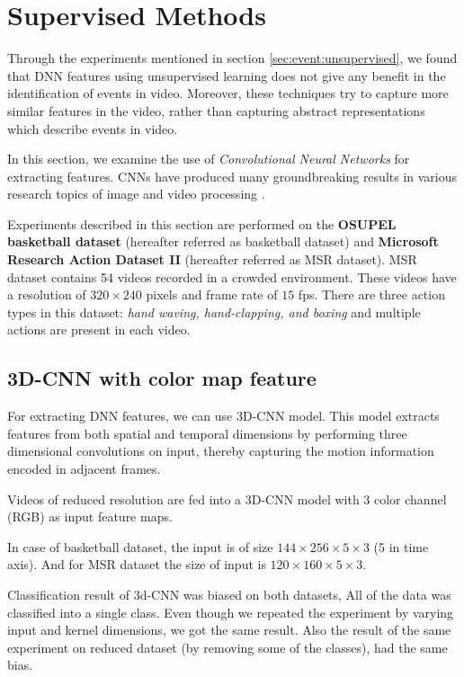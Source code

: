 \section{Supervised Methods}
\label{sec:event:supervised}
Through the experiments mentioned in section  \ref{sec:event:unsupervised}, we found that DNN features using unsupervised learning does not give any benefit in the identification of events in video.  Moreover, these techniques try to capture more similar features in the video, rather than capturing abstract representations which describe events in video.

In this section, we examine the use of \textit{Convolutional Neural Networks} for extracting features.  CNNs have produced many groundbreaking results in various research topics of image and video processing \citep{KarpathyCVPR14, ji20133d, krizhevsky2012imagenet}.

Experiments described in this section are performed on the \textbf{OSUPEL basketball dataset} \cite{brendel2011probabilistic} (hereafter referred as basketball dataset) and \textbf{Microsoft Research Action Dataset \RN{2}} (hereafter referred as MSR dataset).  MSR dataset contains 54 videos recorded in a crowded environment.  These videos have a resolution of $320 \times 240$ pixels and frame rate of $15$ fps.  There are three action types in this dataset: \textit{hand waving, hand-clapping, and boxing } and multiple actions are present in each video.

\subsection{3D-CNN with color map feature}
For extracting DNN features, we can use 3D-CNN model.  This model extracts features from both spatial and temporal dimensions by performing three dimensional convolutions on input, thereby capturing the motion information encoded in adjacent frames\citep{ji20133d}.

Videos of reduced resolution are fed into a 3D-CNN model with 3 color channel (RGB) as input feature maps.

In case of basketball dataset, the input is of size $144 \times 256 \times 5 \times 3$ (5 in time axis).  And for MSR dataset the size of input is $120 \times 160 \times 5 \times 3$.

Classification result of 3d-CNN was biased on both datasets, All of the data was classified into a single class.  Even though we repeated the experiment by varying input and kernel dimensions, we got the same result.  Also the result of the same experiment on reduced dataset (by removing some of the classes), had the same bias.

